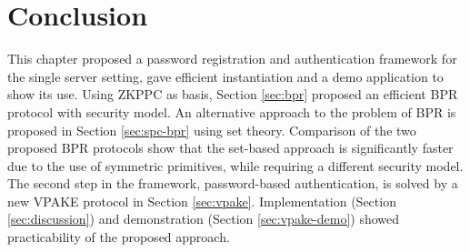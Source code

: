 


\section{Conclusion} \label{sec:vpake-conclusion}
This chapter proposed a password registration and authentication framework for the single server setting, gave efficient instantiation and a demo application to show its use.
Using \ac{ZKPPC} as basis, Section \ref{sec:bpr} proposed an efficient \acl{BPR} protocol with security model.
An alternative approach to the problem of \ac{BPR} is proposed in Section \ref{sec:spc-bpr} using set theory.
Comparison of the two proposed \ac{BPR} protocols show that the set-based approach is significantly faster due to the use of symmetric primitives, while requiring a different security model.
The second step in the framework, password-based authentication, is solved by a new \ac{VPAKE} protocol in Section \ref{sec:vpake}.
Implementation (Section \ref{sec:discussion}) and demonstration (Section \ref{sec:vpake-demo}) showed practicability of the proposed approach.
